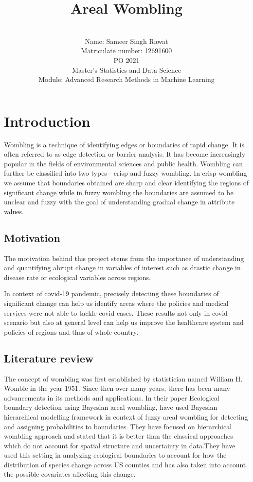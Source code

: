 \documentclass[enabledeprecatedfontcommands,parskip=half,twoside=semi,BCOR=0mm]{scrreprt}
\title{Areal Wombling}
\author{\\
Name: Sameer Singh Rawat\\
Matriculate number: 12691600\\
PO 2021\\
Master's Statistics and Data Science\\
Module: Advanced Research Methods in Machine Learning}
\date{}
\numberwithin{equation}{chapter}
\theoremstyle{definition}
\theoremstyle{remark}
\begin{document}

	
    \maketitle
    
    \tableofcontents
	\newpage
    
    \chapter{Introduction}
    Wombling is a technique of identifying edges or boundaries of rapid change. It is often referred to as edge detection or barrier analysis. It has become increasingly popular in the fields of environmental sciences and public health. Wombling can further be classified into two types - crisp and fuzzy wombling. In crisp wombling we assume that boundaries obtained are sharp and clear identifying the regions of significant change while in fuzzy wombling the boundaries are assumed to be unclear and fuzzy with the goal of understanding gradual change in attribute values.
    
    \section{Motivation}
    The motivation behind this project stems from the importance of understanding and quantifying abrupt change in variables of interest such as drastic change in disease rate or ecological variables across regions.
    
    In context of covid-19 pandemic, precisely detecting these boundaries of significant change can help us identify areas where the policies and medical services were not able to tackle covid cases. These results not only in covid scenario but also at general level can help us improve the healthcare system and policies of regions and thus of whole country.  
    
    \section{Literature review}
    The concept of wombling was first established by statistician named William H. Womble in the year 1951. Since then over many years, there has been many advancements in its methods and applications. In their paper Ecological boundary detection using Bayesian areal wombling, \cite{Fitzpatrick.2010} have used Bayesian hierarchical modelling framework in context of fuzzy areal wombling for detecting and assigning probabilities to boundaries. They have focused on hierarchical wombling approach and stated that it is better than the classical approaches which do not account for spatial structure and uncertainty in data.They have used this setting in analyzing ecological boundaries to account for how the distribution of species change across US counties and has also taken into account the possible covariates affecting this change.
\end{document}
